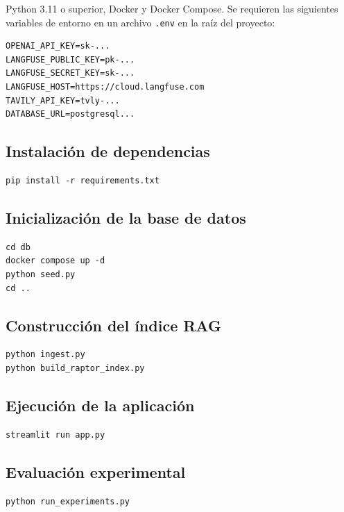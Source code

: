 \documentclass[conference]{IEEEtran}
\begin{document}
Python 3.11 o superior, Docker y Docker Compose. Se requieren las siguientes variables de entorno en un archivo \texttt{.env} en la raíz del proyecto:

\begin{verbatim}
OPENAI_API_KEY=sk-...
LANGFUSE_PUBLIC_KEY=pk-...
LANGFUSE_SECRET_KEY=sk-...
LANGFUSE_HOST=https://cloud.langfuse.com
TAVILY_API_KEY=tvly-...
DATABASE_URL=postgresql...
\end{verbatim}

\subsection{Instalación de dependencias}

\begin{verbatim}
pip install -r requirements.txt
\end{verbatim}

\subsection{Inicialización de la base de datos}

\begin{verbatim}
cd db
docker compose up -d
python seed.py
cd ..
\end{verbatim}

\subsection{Construcción del índice RAG}

\begin{verbatim}
python ingest.py
python build_raptor_index.py
\end{verbatim}

\subsection{Ejecución de la aplicación}

\begin{verbatim}
streamlit run app.py
\end{verbatim}

\subsection{Evaluación experimental}

\begin{verbatim}
python run_experiments.py
\end{verbatim}
\end{document}
